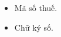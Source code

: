 \begin{itemize}
\begin{itemize}
\begin{itemize}
\begin{note}
                                  \begin{itemize}

                                      \item Mã số thuế.

                                      \item Chữ ký số.

                                  \end{itemize}
                              \end{note}

                    \end{itemize}

          \end{itemize}

\end{itemize}




% 













